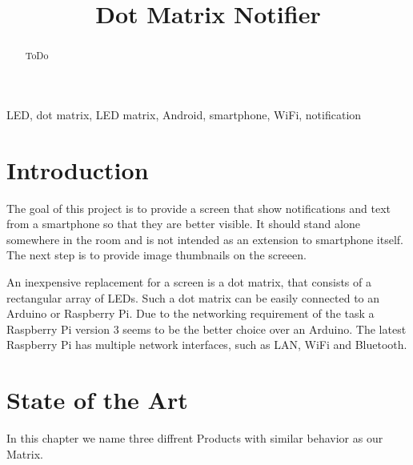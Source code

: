 \documentclass[conference]{IEEEtran}
\begin{document}
\title{Dot Matrix Notifier}

\author{
\and
{}
\and
{}
}

\maketitle

\begin{abstract}
ToDo
\end{abstract}


\begin{IEEEkeywords}
LED, dot matrix, LED matrix, Android, smartphone, WiFi, notification
\end{IEEEkeywords}


\section{Introduction}
The goal of this project is to provide a screen that show notifications and text from a smartphone so that they are better visible. It should stand alone somewhere in the room and is not intended as an extension to smartphone itself. The next step is to provide image thumbnails on the screeen.

An inexpensive replacement for a screen is a dot matrix, that consists of a rectangular array of LEDs. Such a dot matrix can be easily connected to an Arduino or Raspberry Pi. Due to the networking requirement of the task a Raspberry Pi version 3 seems to be the better choice over an Arduino. The latest Raspberry Pi has multiple network interfaces, such as LAN, WiFi and Bluetooth.


\section{State of the Art}
In this chapter we name three diffrent Products with similar behavior as our Matrix.
\end{document}
